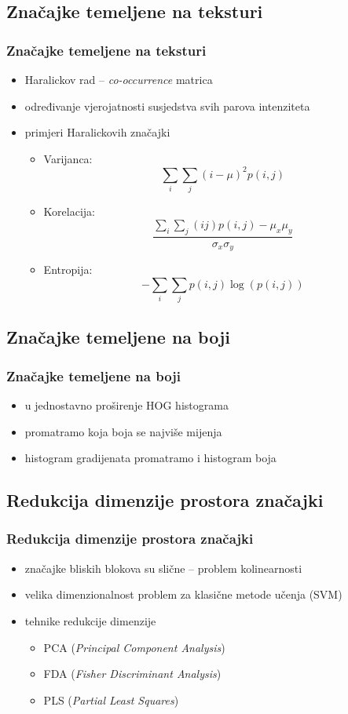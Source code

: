 \documentclass{beamer}
\begin{document}
\subsection{Značajke temeljene na teksturi}
\begin{frame}
\frametitle{Značajke temeljene na teksturi}
\begin{itemize}
\item Haralickov rad \cite{Haralick} -- \emph{co-occurrence} matrica
\item određivanje vjerojatnosti susjedstva svih parova intenziteta
\item primjeri Haralickovih značajki 
\begin{itemize}
\item Varijanca: $$\sum_{i}\sum_{j}(i - \mu)^2p(i, j)$$
\item Korelacija: $$\frac{\sum_{i}\sum_{j}(ij)p(i,j) - \mu_{x}\mu_{y}}{\sigma_{x}\sigma_{y}}$$
\item Entropija: $$-\sum_{i}\sum_{j}p(i, j)\log(p(i, j))$$
\end{itemize}
\end{itemize}
\end{frame}

\subsection{Značajke temeljene na boji}
\begin{frame}
\frametitle{Značajke temeljene na boji}
\begin{itemize}
\item u \cite{Schwartz} jednostavno proširenje HOG histograma
\item promatramo koja boja se najviše mijenja
\item histogram gradijenata promatramo i histogram boja
\end{itemize}
\end{frame}

\subsection{Redukcija dimenzije prostora značajki}
\begin{frame}
\frametitle{Redukcija dimenzije prostora značajki}
\begin{itemize}
\item značajke bliskih blokova su slične -- problem kolinearnosti
\item velika dimenzionalnost problem za klasične metode učenja (SVM)
\item tehnike redukcije dimenzije
\begin{itemize}
\item PCA (\emph{Principal Component Analysis}) 
\item FDA (\emph{Fisher Discriminant Analysis})
\item PLS (\emph{Partial Least Squares})
\end{itemize}
\end{itemize}
\end{frame}
\end{document}
